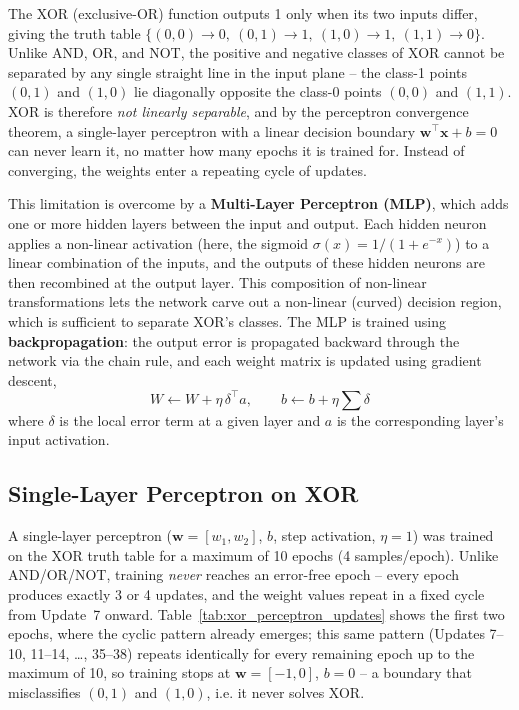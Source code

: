 \documentclass[12pt,a4paper]{article}
\begin{document}
The XOR (exclusive-OR) function outputs 1 only when its two inputs differ, giving
the truth table $\{(0,0){\to}0,\ (0,1){\to}1,\ (1,0){\to}1,\ (1,1){\to}0\}$. Unlike
AND, OR, and NOT, the positive and negative classes of XOR cannot be separated by
any single straight line in the input plane -- the class-1 points $(0,1)$ and
$(1,0)$ lie diagonally opposite the class-0 points $(0,0)$ and $(1,1)$. XOR is
therefore \textit{not linearly separable}, and by the perceptron convergence
theorem, a single-layer perceptron with a linear decision boundary
$\mathbf{w}^{\top}\mathbf{x}+b=0$ can never learn it, no matter how many epochs it
is trained for. Instead of converging, the weights enter a repeating cycle of
updates.

This limitation is overcome by a \textbf{Multi-Layer Perceptron (MLP)}, which adds
one or more hidden layers between the input and output. Each hidden neuron applies
a non-linear activation (here, the sigmoid $\sigma(x) = 1/(1+e^{-x})$) to a linear
combination of the inputs, and the outputs of these hidden neurons are then
recombined at the output layer. This composition of non-linear transformations
lets the network carve out a non-linear (curved) decision region, which is
sufficient to separate XOR's classes. The MLP is trained using
\textbf{backpropagation}: the output error is propagated backward through the
network via the chain rule, and each weight matrix is updated using gradient
descent,
\begin{equation}
    W \leftarrow W + \eta \, \delta^{\top} a, \qquad
    b \leftarrow b + \eta \sum \delta
\end{equation}
where $\delta$ is the local error term at a given layer and $a$ is the
corresponding layer's input activation.

\subsection{Single-Layer Perceptron on XOR}

A single-layer perceptron ($\mathbf{w}=[w_1,w_2]$, $b$, step activation, $\eta=1$)
was trained on the XOR truth table for a maximum of 10 epochs (4 samples/epoch).
Unlike AND/OR/NOT, training \textit{never} reaches an error-free epoch -- every
epoch produces exactly 3 or 4 updates, and the weight values repeat in a fixed
cycle from Update~7 onward. Table~\ref{tab:xor_perceptron_updates} shows the first
two epochs, where the cyclic pattern already emerges; this same pattern (Updates
7--10, 11--14, \ldots, 35--38) repeats identically for every remaining epoch up to
the maximum of 10, so training stops at $\mathbf{w}=[-1,0]$, $b=0$ -- a boundary
that misclassifies $(0,1)$ and $(1,0)$, i.e. it never solves XOR.
\end{document}
